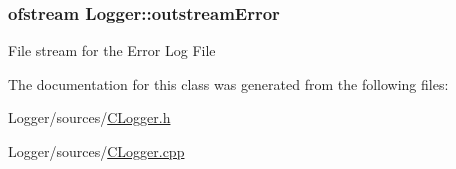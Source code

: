 \subsubsection[{outstream\+Error}]{\setlength{\rightskip}{0pt plus 5cm}ofstream Logger\+::outstream\+Error\hspace{0.3cm}{\ttfamily [private]}}\label{class_logger_a0f77a112075ae81cfc89f79225967486}
File stream for the Error Log File 

The documentation for this class was generated from the following files\+:\begin{DoxyCompactItemize}
\item 
Logger/sources/\hyperlink{_c_logger_8h}{C\+Logger.\+h}\item 
Logger/sources/\hyperlink{_c_logger_8cpp}{C\+Logger.\+cpp}\end{DoxyCompactItemize}
